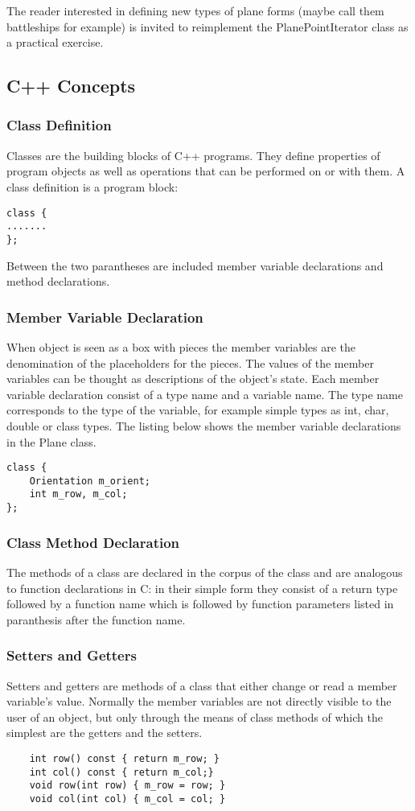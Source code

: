 \documentclass{article}
\begin{document}
The reader interested in defining new types of plane forms (maybe call them battleships for example) is invited to reimplement the PlanePointIterator class as a practical exercise.

\subsection {C++ Concepts}

\subsubsection {Class Definition}
Classes are the building blocks of C++ programs. They define properties of program objects as well as operations that can be performed on or with them. A class definition is a program block:
\begin{lstlisting}
class {
.......
};
\end{lstlisting}
Between the two parantheses  are included member variable declarations and method declarations. 

\subsubsection {Member Variable Declaration}
When object is seen as a box with pieces the member variables are the denomination of the placeholders for the pieces. The values of the member variables can be thought as descriptions of the object's state. Each member variable declaration consist of a type name and a variable name. The type name corresponds to the type of the variable, for example simple types as int, char, double or class types.
The listing below shows the member variable declarations in the Plane class.
\begin{lstlisting}
class {
    Orientation m_orient;
    int m_row, m_col;
};
\end{lstlisting}

\subsubsection {Class Method Declaration}
The methods of a class are declared in the corpus of the class and are analogous to function declarations in C: in their simple form they consist of a return type followed by a function name which is followed by function parameters listed in paranthesis after the function name.

\subsubsection {Setters and Getters}
Setters and getters are methods of a class that either change or read a member variable's value. Normally the member variables are not directly visible to the user of an object, but only through the means of class methods of which the simplest are the getters and the setters.
\begin{lstlisting}
    int row() const { return m_row; }
    int col() const { return m_col;}
    void row(int row) { m_row = row; }
    void col(int col) { m_col = col; }
\end{lstlisting}
\end{document}
